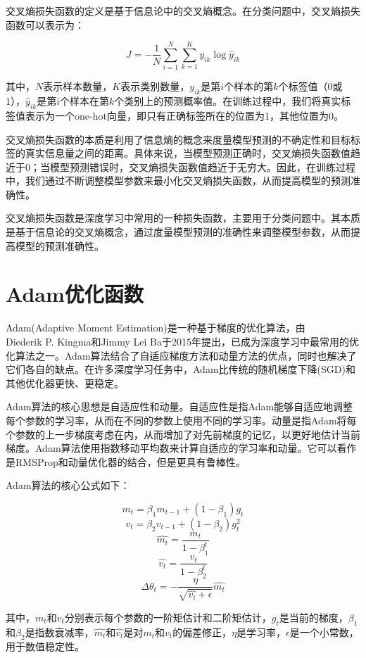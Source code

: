 \documentclass{report}
\begin{document}
	交叉熵损失函数的定义是基于信息论中的交叉熵概念。在分类问题中，交叉熵损失函数可以表示为：
	
	$$J=-\frac{1}{N}\sum_{i=1}^{N}\sum_{k=1}^{K}y_{ik}\log{\hat{y}_{ik}}$$
	
	其中，$N$表示样本数量，$K$表示类别数量，$y_{ik}$是第$i$个样本的第$k$个标签值（0或1），$\hat{y}_{ik}$是第$i$个样本在第$k$个类别上的预测概率值。在训练过程中，我们将真实标签值表示为一个one-hot向量，即只有正确标签所在的位置为1，其他位置为0。
	
	交叉熵损失函数的本质是利用了信息熵的概念来度量模型预测的不确定性和目标标签的真实信息量之间的距离。具体来说，当模型预测正确时，交叉熵损失函数值趋近于0；当模型预测错误时，交叉熵损失函数值趋近于无穷大。因此，在训练过程中，我们通过不断调整模型参数来最小化交叉熵损失函数，从而提高模型的预测准确性。
	
	交叉熵损失函数是深度学习中常用的一种损失函数，主要用于分类问题中。其本质是基于信息论的交叉熵概念，通过度量模型预测的准确性来调整模型参数，从而提高模型的预测准确性。
	
	\section{Adam优化函数}
	Adam(Adaptive Moment Estimation)是一种基于梯度的优化算法，由\\Diederik P. Kingma和Jimmy Lei Ba于2015年提出，已成为深度学习中最常用的优化算法之一。Adam算法结合了自适应梯度方法和动量方法的优点，同时也解决了它们各自的缺点。在许多深度学习任务中，Adam比传统的随机梯度下降(SGD)和其他优化器更快、更稳定。
	
	Adam算法的核心思想是自适应性和动量。自适应性是指Adam能够自适应地调整每个参数的学习率，从而在不同的参数上使用不同的学习率。动量是指Adam将每个参数的上一步梯度考虑在内，从而增加了对先前梯度的记忆，以更好地估计当前梯度。Adam算法使用指数移动平均数来计算自适应的学习率和动量。它可以看作是RMSProp和动量优化器的结合，但是更具有鲁棒性。
	
	Adam算法的核心公式如下：
	
	$$
	m_t=\beta_1m_{t-1}+(1-\beta_1)g_t 
	$$
	$$
	v_t=\beta_2v_{t-1}+(1-\beta_2)g_t^2
	$$
	$$
	\hat{m_t}=\frac{m_t}{1-\beta_1^t}
	$$
	$$
	\hat{v_t}=\frac{v_t}{1-\beta_2^t}
	$$
	$$
	\Delta\theta_t=-\frac{\eta}{\sqrt{\hat{v_t}+\epsilon}}\hat{m_t}
	$$

	
	其中，$m_t$和$v_t$分别表示每个参数的一阶矩估计和二阶矩估计，$g_t$是当前的梯度，$\beta_1$和$\beta_2$是指数衰减率，$\hat{m_t}$和$\hat{v_t}$是对$m_t$和$v_t$的偏差修正，$\eta$是学习率，$\epsilon$是一个小常数，用于数值稳定性。
	
\end{document}

